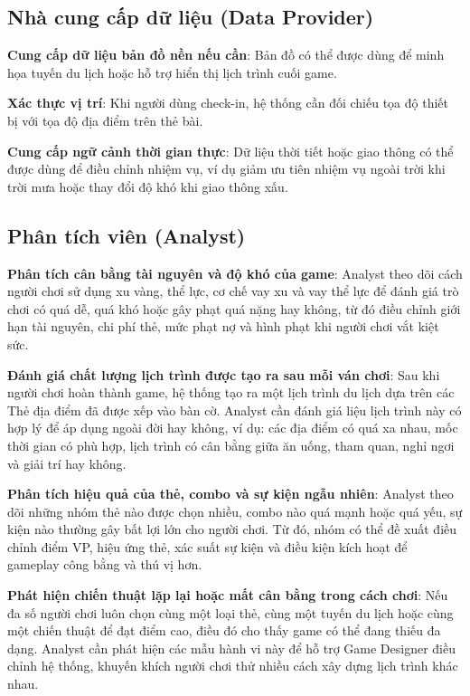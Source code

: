\subsection{Nhà cung cấp dữ liệu (Data Provider)}

\textbf{Cung cấp dữ liệu bản đồ nền nếu cần}: Bản đồ có thể được dùng để minh họa tuyến du lịch hoặc hỗ trợ hiển thị lịch trình cuối game.

\textbf{Xác thực vị trí}: Khi người dùng check-in, hệ thống cần đối chiếu tọa độ thiết bị với tọa độ địa điểm trên thẻ bài.

\textbf{Cung cấp ngữ cảnh thời gian thực}: Dữ liệu thời tiết hoặc giao thông có thể được dùng để điều chỉnh nhiệm vụ, ví dụ giảm ưu tiên nhiệm vụ ngoài trời khi trời mưa hoặc thay đổi độ khó khi giao thông xấu.

\subsection{Phân tích viên (Analyst)}

\textbf{Phân tích cân bằng tài nguyên và độ khó của game}: Analyst theo dõi cách người chơi sử dụng xu vàng, thể lực, cơ chế vay xu và vay thể lực để đánh giá trò chơi có quá dễ, quá khó hoặc gây phạt quá nặng hay không, từ đó điều chỉnh giới hạn tài nguyên, chi phí thẻ, mức phạt nợ và hình phạt khi người chơi vắt kiệt sức.

\textbf{Đánh giá chất lượng lịch trình được tạo ra sau mỗi ván chơi}: Sau khi người chơi hoàn thành game, hệ thống tạo ra một lịch trình du lịch dựa trên các Thẻ địa điểm đã được xếp vào bàn cờ. Analyst cần đánh giá liệu lịch trình này có hợp lý để áp dụng ngoài đời hay không, ví dụ: các địa điểm có quá xa nhau, mốc thời gian có phù hợp, lịch trình có cân bằng giữa ăn uống, tham quan, nghỉ ngơi và giải trí hay không.

\textbf{Phân tích hiệu quả của thẻ, combo và sự kiện ngẫu nhiên}: Analyst theo dõi những nhóm thẻ nào được chọn nhiều, combo nào quá mạnh hoặc quá yếu, sự kiện nào thường gây bất lợi lớn cho người chơi. Từ đó, nhóm có thể đề xuất điều chỉnh điểm VP, hiệu ứng thẻ, xác suất sự kiện và điều kiện kích hoạt để gameplay công bằng và thú vị hơn.

\textbf{Phát hiện chiến thuật lặp lại hoặc mất cân bằng trong cách chơi}: Nếu đa số người chơi luôn chọn cùng một loại thẻ, cùng một tuyến du lịch hoặc cùng một chiến thuật để đạt điểm cao, điều đó cho thấy game có thể đang thiếu đa dạng. Analyst cần phát hiện các mẫu hành vi này để hỗ trợ Game Designer điều chỉnh hệ thống, khuyến khích người chơi thử nhiều cách xây dựng lịch trình khác nhau.

